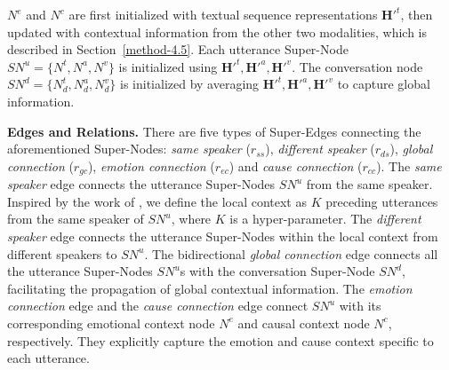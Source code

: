 \documentclass[11pt]{article}
\begin{document}
$N^e$ and $N^c$ are first initialized with textual sequence representations $\bm{H}'^t$, then updated with contextual information from the other two modalities, which is described in Section~\ref{method-4.5}.
Each utterance Super-Node $SN^u =\{N^t,N^a,N^v\}$ is initialized using $\bm{H}'^t,\bm{H}'^a,\bm{H}'^v$.
The conversation node $SN^d=\{N_d^t,N_d^a,N_d^v\}$ is initialized by averaging $\bm{H}'^t,\bm{H}'^a,\bm{H}'^v$ to capture global information.

\noindent\textbf{Edges and Relations.} There are five types of Super-Edges connecting the aforementioned Super-Nodes: \textit{same speaker} ($r_{ss}$), \textit{different speaker} ($r_{ds}$), \textit{global connection} ($r_{gc}$), \textit{emotion connection} ($r_{ec}$) and \textit{cause connection} ($r_{cc}$).
The \textit{same speaker} edge connects the utterance Super-Nodes $SN^u$ from the same speaker.
Inspired by the work of \citet{DAG-ERC}, we define the local context as $K$ preceding utterances from the same speaker of $SN^u$, where $K$ is a hyper-parameter.
The \textit{different speaker} edge connects the utterance Super-Nodes within the local context from different speakers to $SN^u$.
The bidirectional \textit{global connection} edge connects all the utterance Super-Nodes $SN^u$s with the conversation Super-Node $SN^d$, facilitating the propagation of global contextual information.
The \textit{emotion connection} edge and the \textit{cause connection} edge 
connect $SN^u$ with its corresponding emotional context node $N^e$ and causal context node $N^c$, respectively.
They explicitly capture the emotion and cause context specific to each utterance.
\end{document}
